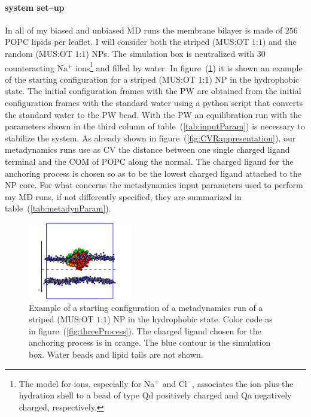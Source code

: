 \paragraph{\textbf{system set--up}} In all of my biased and unbiased \ac{MD} runs the membrane bilayer is made of $256$ \ac{POPC} lipids per leaflet. I will consider both the striped (\ac{MUS}:\ac{OT} $1$:$1$) and the random (\ac{MUS}:\ac{OT} $1$:$1$) \acp{NP}. The simulation box is neutralized with $30$ counteracting Na$^+$ ions\footnote{The \martini model for ions, especially for Na$^+$ and Cl$^-$, associates the ion plus the hydration shell to a bead of type Qd positively charged and Qa negatively charged, respectively.} and filled by water. In figure~(\ref{fig:startFrameHydro}) it is shown an example of the starting configuration for a striped (\ac{MUS}:\ac{OT} $1$:$1$) \ac{NP} in the hydrophobic state. The initial configuration frames with the \ac{PW} are obtained from the initial configuration frames with the standard \martini water using a python script that converts the standard \martini water to the \ac{PW} bead. With the \ac{PW} an equilibration run with the parameters shown in the third column of table~(\ref{tab:inputParam}) is necessary to stabilize the system. As already shown in figure~(\ref{fig:CVRappresentation}), our metadynamics runs use as \ac{CV} the distance between one single charged ligand terminal and the \ac{COM} of \ac{POPC} along the normal. The charged ligand for the anchoring process is chosen so as to be the lowest charged ligand attached to the \ac{NP} core. For what concerns the metadynamics input parameters used to perform my \ac{MD} runs, if not differently specified, they are summarized in table~(\ref{tab:metadynParam}).
\begin{figure}
	\centering
	\includegraphics[width=0.4\textwidth]{./img/patchedHydrophobic}
	\caption{Example of a starting configuration of a metadynamics run of a striped (\ac{MUS}:\ac{OT} $1$:$1$) \ac{NP} in the hydrophobic state. Color code as in figure~(\ref{fig:threeProcess}). The charged ligand chosen for the anchoring process is in orange. The blue contour is the simulation box. Water beads and lipid tails are not shown.}%
	\label{fig:startFrameHydro}
\end{figure}

